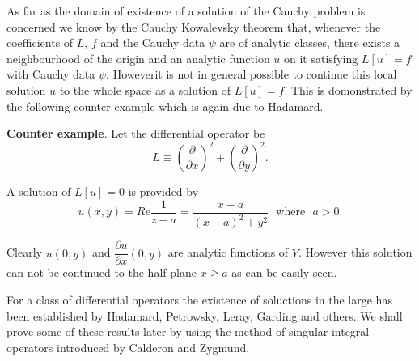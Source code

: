 As far as the domain of existence of a solution of the  Cauchy problem
is concerned we know by the Cauchy Kowalevsky theorem that,  whenever
the coefficients of $L$, $f$ and the Cauchy data $\psi$ are of
analytic classes,  there exists a neighbourhood of the origin and an
analytic function $u$ on it satisfying $L[u] = f$ with Cauchy data
$\psi$. However\pageoriginale it is not in general possible to
continue this local 
solution $u$ to the whole space as a solution of $L[u]=f$. This is
domonstrated by the following counter example which is again due to
Hadamard. 

\medskip
\noindent
\textbf{Counter example}. Let the differential operator be
$$
L \equiv \left(\frac{\partial}{\partial x}\right)^2+
\left(\frac{\partial}{\partial   y}\right)^2. 
$$

A solution of $L[u] = 0$ is provided by
$$
u(x,  y) = Re \frac{1}{z-a} = \frac{x-a}{(x-a)^2 + y^2} \text{~ where~ }
a>0.  
$$

Clearly $u(0,  y)$ and $\dfrac{\partial u}{\partial x}(0,  y)$ are
analytic functions of $Y$. However this solution can not be continued
to the half plane $x \geq a$ as can be easily seen. 

For a class of differential operators the existence of soluctions in
the large has been established by Hadamard,  Petrowsky,  Leray,
Garding and others. We shall  prove some of these results later by
using the method of singular integral operators introduced by Calderon
and Zygmund.

